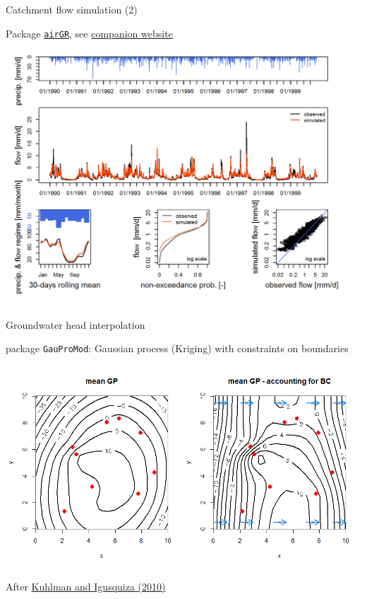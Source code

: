 \documentclass[8pt,ignorenonframetext,]{beamer}
\begin{document}
\begin{frame}[fragile]{Catchment flow simulation (2)}

Package
\href{https://cran.r-project.org/web/packages/airGR/index.html}{\texttt{airGR}},
see \href{https://odelaigue.github.io/airGR/index.html}{companion
website}

\includegraphics{imgPres/airGR.png}

\end{frame}

\begin{frame}[fragile]{Groundwater head interpolation}

package \texttt{GauProMod}: Gaussian process (Kriging) with constraints
on boundaries

\includegraphics{imgPres/GP_head_interpolation.png}

After \href{https://doi.org/10.1016/j.jhydrol.2010.01.002}{Kuhlman and
Igusquiza (2010)}

\end{frame}
\end{document}
